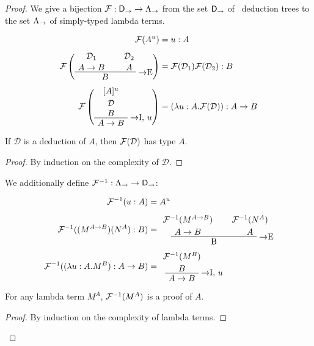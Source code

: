 \begin{proof}
We give a bijection $\mathcal{F}: \mathsf{D}_\to \to \Lambda_\to$ from the set $\mathsf{D}_\to$
of \implnpi\ deduction trees to the set $\Lambda_\to$ of simply-typed lambda terms.

\begin{alignat*}{2}
\chmap(A^u) &= u: A \\[0.5em]
\chmap\left(
  \AxiomC{$\mathcal{D}_1$}
  \noLine
  \UnaryInfC{$A \to B$}
  \AxiomC{$\mathcal{D}_2$}
  \noLine
  \UnaryInfC{$A$}
  \RightLabel{$\to$E}
  \BinaryInfC{$B$}
  \DisplayProof
\right) &= \chmap(\mathcal{D}_1) \chmap(\mathcal{D}_2): B \\[0.5em]
\chmap\left(
  \AxiomC{$[A]^u$}
  \noLine
  \UnaryInfC{$\mathcal{D}$}
  \noLine
  \UnaryInfC{$B$}
  \RightLabel{$\to$I, $u$}
  \UnaryInfC{$A \to B$}
  \DisplayProof
\right) &= (\lambda u: A.\chmap(\mathcal{D})): A \to B
\end{alignat*}

\begin{proposition}
If $\mathcal{D}$ is a deduction of $A$, then $\mathcal{F}(\mathcal{D})$ has type $A$.
\end{proposition}

\begin{proof}
By induction on the complexity of $\mathcal{D}$.
\end{proof}

We additionally define $\mathcal{F}^{-1}: \Lambda_\to \to \mathsf{D}_\to$:

\begin{alignat*}{2}
\chmapanta(u: A) &= A^u \\[0.5em]
\chmapanta((M^{A \to B})(N^A): B) &=
  \AxiomC{$\chmapanta(M^{A \to B})$}
  \noLine
  \UnaryInfC{$A \to B$}
  \AxiomC{$\chmapanta(N^A)$}
  \noLine
  \UnaryInfC{$A$}
  \RightLabel{$\to$E}
  \BinaryInfC{B}
  \DisplayProof \\[0.5em]
\chmapanta((\lambda u:A.M^B):A \to B) &=
  \AxiomC{$\chmapanta(M^B)$}
  \noLine
  \UnaryInfC{$B$}
  \RightLabel{$\to$I, $u$}
  \UnaryInfC{$A \to B$}
  \DisplayProof
\end{alignat*}

\begin{proposition}
For any lambda term $M^A$, $\mathcal{F}^{-1}(M^A)$ is a proof of $A$.
\end{proposition}

\begin{proof}
By induction on the complexity of lambda terms.
\end{proof}


\end{proof}
